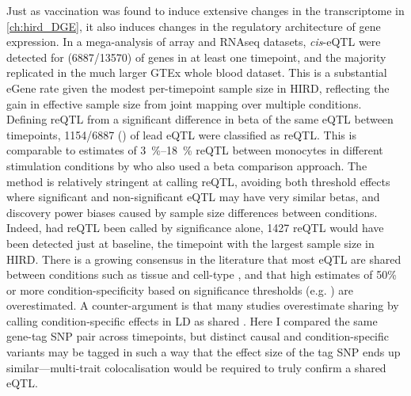 Just as vaccination was found to induce extensive changes in the transcriptome
in \cref{ch:hird_DGE},
it also induces changes in the regulatory architecture of gene expression.
In a mega-analysis of array and \gls{RNAseq} datasets,
\textit{cis}-\gls{eQTL} were detected for  (\num{6887/13570}) of genes in at least one timepoint,
and the majority replicated in the much larger GTEx whole blood dataset.
This is a substantial eGene rate given the modest per-timepoint sample size in \gls{HIRD}, reflecting the gain in effective sample size from joint mapping over multiple conditions.
Defining reQTL from a significant difference in beta of the same \gls{eQTL} between timepoints,
\num{1154/6887} () of lead \gls{eQTL} were classified as \gls{reQTL}.
This is comparable to estimates of \SIrange{3}{18}{\%} \gls{reQTL} between monocytes in different stimulation conditions by \textcite{kim-hellmuth2017GeneticRegulatoryEffects} who also used a beta comparison approach.
The method is relatively stringent at calling \gls{reQTL},
avoiding both threshold effects where significant and non-significant \gls{eQTL} may have very similar betas,
and discovery power biases caused by sample size differences between conditions.
Indeed, had \gls{reQTL} been called by significance alone, 1427 \gls{reQTL} would have been detected just at baseline, the timepoint with the largest sample size in \gls{HIRD}.
There is a growing consensus in the literature that most \gls{eQTL} are shared between conditions such as tissue and cell-type \autocite{ongen2017EstimatingCausalTissues,urbut2018FlexibleStatisticalMethods,kim-hellmuth2020CellTypeSpecific,umans2020WhereAreDiseaseAssociated},
and that high estimates of 50\% or more condition-specificity based on significance thresholds (e.g. \autocite{ackermann2013ImpactNaturalGenetic}) are overestimated.
A counter-argument is that many studies overestimate sharing by calling condition-specific effects in \gls{LD} as shared \autocite{umans2020WhereAreDiseaseAssociated}.
Here I compared the same gene-tag \gls{SNP} pair across timepoints,
but distinct causal and condition-specific variants may be tagged in such a way that the effect size of the tag \gls{SNP} ends up similar---multi-trait colocalisation would be required to truly confirm a shared \gls{eQTL}.

